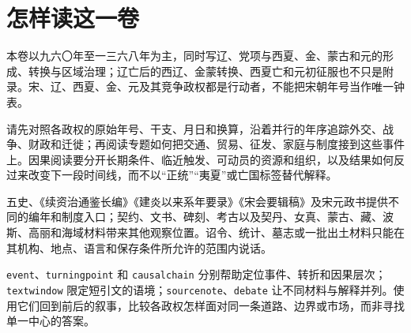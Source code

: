 \chapter*{怎样读这一卷}

本卷以九六〇年至一三六八年为主，同时写辽、党项与西夏、金、蒙古和元的形成、转换与区域治理；辽亡后的西辽、金蒙转换、西夏亡和元初征服也不只是附录。宋、辽、西夏、金、元及其竞争政权都是行动者，不能把宋朝年号当作唯一钟表。

请先对照各政权的原始年号、干支、月日和换算，沿着并行的年序追踪外交、战争、财政和迁徙；再阅读专题如何把交通、贸易、征发、家庭与制度接到这些事件上。因果阅读要分开长期条件、临近触发、可动员的资源和组织，以及结果如何反过来改变下一段时间线，而不以“正统”“夷夏”或亡国标签替代解释。

五史、《续资治通鉴长编》《建炎以来系年要录》《宋会要辑稿》及宋元政书提供不同的编年和制度入口；契约、文书、碑刻、考古以及契丹、女真、蒙古、藏、波斯、高丽和海域材料带来其他观察位置。诏令、统计、墓志或一批出土材料只能在其机构、地点、语言和保存条件所允许的范围内说话。

\texttt{event}、\texttt{turningpoint} 和 \texttt{causalchain} 分别帮助定位事件、转折和因果层次；\texttt{textwindow} 限定短引文的语境；\texttt{sourcenote}、\texttt{debate} 让不同材料与解释并列。使用它们回到前后的叙事，比较各政权怎样面对同一条道路、边界或市场，而非寻找单一中心的答案。
